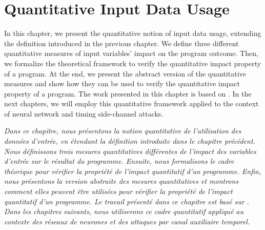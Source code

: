 %

\chapter{Quantitative Input Data Usage}


In this chapter, we present the quantitative notion of input data usage, extending the definition introduced in the previous chapter.
We define three different quantitative measures of input variables' impact on the program outcome.
Then, we formalize the theoretical framework to verify the quantitative impact property of a program.
At the end, we present the abstract version of the quantitative measures and show how they can be used to verify the quantitative impact property of a program.
The work presented in this chapter is based on \textcite{Mazzucato2024nfm}.
In the next chapters, we will employ this quantitative framework applied to the context of neural network and timing side-channel attacks.

\emph{Dans ce chapitre, nous présentons la notion quantitative de l'utilisation des données d'entrée, en étendant la définition introduite dans le chapitre précédent.
Nous définissons trois mesures quantitatives différentes de l'impact des variables d'entrée sur le résultat du programme.
Ensuite, nous formalisons le cadre théorique pour vérifier la propriété de l'impact quantitatif d'un programme.
Enfin, nous présentons la version abstraite des mesures quantitatives et montrons comment elles peuvent être utilisées pour vérifier la propriété de l'impact quantitatif d'un programme.
Le travail présenté dans ce chapitre est basé sur .
Dans les chapitres suivants, nous utiliserons ce cadre quantitatif appliqué au contexte des réseaux de neurones et des attaques par canal auxiliaire temporel.
}



